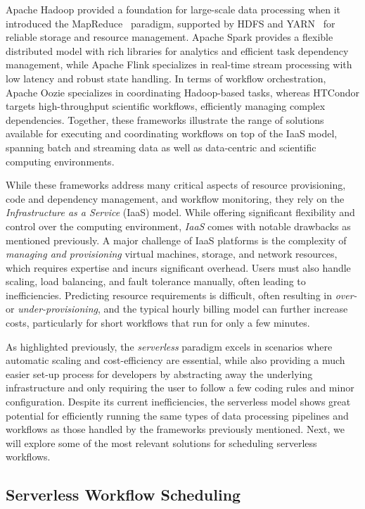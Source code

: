 Apache Hadoop provided a foundation for large-scale data processing when it introduced the MapReduce~\cite{mapreduce} paradigm, supported by HDFS and YARN~\cite{yarn} for reliable storage and resource management. Apache Spark provides a flexible distributed model with rich libraries for analytics and efficient task dependency management, while Apache Flink specializes in real-time stream processing with low latency and robust state handling. In terms of workflow orchestration, Apache Oozie specializes in coordinating Hadoop-based tasks, whereas HTCondor targets high-throughput scientific workflows, efficiently managing complex dependencies. Together, these frameworks illustrate the range of solutions available for executing and coordinating workflows on top of the IaaS model, spanning batch and streaming data as well as data-centric and scientific computing environments.

While these frameworks address many critical aspects of resource provisioning, code and dependency management, and workflow monitoring, they rely on the \textit{Infrastructure as a Service} (IaaS) model. While offering significant flexibility and control over the computing environment, \textit{IaaS} comes with notable drawbacks as mentioned previously. A major challenge of IaaS platforms is the complexity of \textit{managing and provisioning} virtual machines, storage, and network resources, which requires expertise and incurs significant overhead. Users must also handle scaling, load balancing, and fault tolerance manually, often leading to inefficiencies. Predicting resource requirements is difficult, often resulting in \textit{over-} or \textit{under-provisioning}, and the typical hourly billing model can further increase costs, particularly for short workflows that run for only a few minutes.

As highlighted previously, the \textit{serverless} paradigm excels in scenarios where automatic scaling and cost-efficiency are essential, while also providing a much easier set-up process for developers by abstracting away the underlying infrastructure and only requiring the user to follow a few coding rules and minor configuration. Despite its current inefficiencies, the serverless model shows great potential for efficiently running the same types of data processing pipelines and workflows as those handled by the frameworks previously mentioned. Next, we will explore some of the most relevant solutions for scheduling serverless workflows.

\subsection{Serverless Workflow Scheduling}

